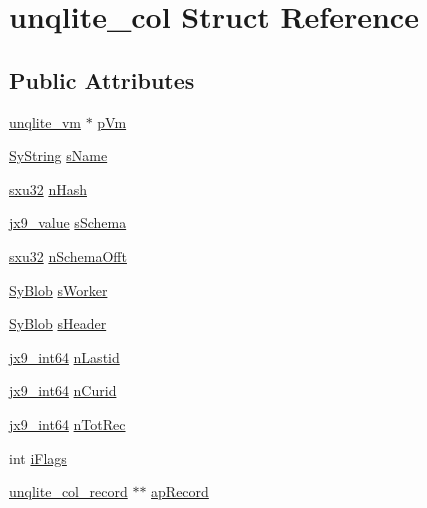 \hypertarget{structunqlite__col}{\section{unqlite\-\_\-col Struct Reference}
\label{dc/de4/structunqlite__col}
}
\subsection*{Public Attributes}
\begin{DoxyCompactItemize}
\item 
\hyperlink{structunqlite__vm}{unqlite\-\_\-vm} $\ast$ \hyperlink{structunqlite__col_a4b6b693f598b3619ebbc9478f90a9a98}{p\-Vm}
\item 
\hyperlink{struct_sy_string}{Sy\-String} \hyperlink{structunqlite__col_aa9d93ceab4d1b8ab0c93f02da06cd17d}{s\-Name}
\item 
\hyperlink{unqlite_8c_abc5a8a3f345c200c98c485551f49666e}{sxu32} \hyperlink{structunqlite__col_a07b17bba19cb585cc37287dbbbc9152d}{n\-Hash}
\item 
\hyperlink{structjx9__value}{jx9\-\_\-value} \hyperlink{structunqlite__col_a0dfa1f86f966d8c89e4b7ed86bcb081a}{s\-Schema}
\item 
\hyperlink{unqlite_8c_abc5a8a3f345c200c98c485551f49666e}{sxu32} \hyperlink{structunqlite__col_a02820501eae2749b269b65a46b5389da}{n\-Schema\-Offt}
\item 
\hyperlink{struct_sy_blob}{Sy\-Blob} \hyperlink{structunqlite__col_a6999264f4ce488694945d3e050f98011}{s\-Worker}
\item 
\hyperlink{struct_sy_blob}{Sy\-Blob} \hyperlink{structunqlite__col_a371d279f270fe4f4bf4ab6c2fd4b2d1c}{s\-Header}
\item 
\hyperlink{unqlite_8c_aeaac5ecf324354b1c4bb9f6559bab7af}{jx9\-\_\-int64} \hyperlink{structunqlite__col_af8dbb5199b5a4f58e1549d51dfbb6a03}{n\-Lastid}
\item 
\hyperlink{unqlite_8c_aeaac5ecf324354b1c4bb9f6559bab7af}{jx9\-\_\-int64} \hyperlink{structunqlite__col_a103468d3e0bf91441d82d0cb13318d62}{n\-Curid}
\item 
\hyperlink{unqlite_8c_aeaac5ecf324354b1c4bb9f6559bab7af}{jx9\-\_\-int64} \hyperlink{structunqlite__col_ade212d6c8ebb3ca27e3c6cc6382bff33}{n\-Tot\-Rec}
\item 
int \hyperlink{structunqlite__col_a294a606c5329d013d55d1f958a51362e}{i\-Flags}
\item 
\hyperlink{structunqlite__col__record}{unqlite\-\_\-col\-\_\-record} $\ast$$\ast$ \hyperlink{structunqlite__col_afc5744315e9ac9e41f7416dacb0d7eb8}{ap\-Record}
$$
\end{DoxyCompactItemize}
